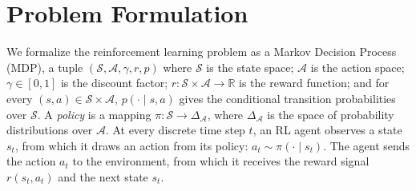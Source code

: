 \documentclass{article}
\newcommand{\R}{\mathbb{R}}
\newcommand{\statespace}{\mathcal{S}}
\newcommand{\actionspace}{\mathcal{A}}
\begin{document}


\section{Problem Formulation}

We formalize the reinforcement learning \citep{sutton2018reinforcement} problem as a {Markov Decision Process} (MDP), a tuple $(\statespace, \actionspace, \gamma, r, p)$ where $\statespace$ is the state space; $\actionspace$ is the action space; $\gamma \in [0,1]$ is the discount factor; $r : \statespace \times \actionspace \to \R$ is the reward function; and for every $(s, a) \in \statespace \times \actionspace$, $p(\cdot \mid s, a)$ gives the conditional transition probabilities over $\statespace$. A \textit{policy} is a mapping $\pi : \statespace \to \Delta_\actionspace$, where $\Delta_\actionspace$ is the space of probability distributions over $\actionspace$. 
%
At every discrete time step $t$, an RL agent observes a state $s_t$, from which it draws an action from its policy: $a_t \sim \pi(\cdot \mid s_t)$. The agent sends the action $a_t$ to the environment, from which it receives the reward signal $r(s_t, a_t)$ and the next state $s_t$. 
\end{document}
